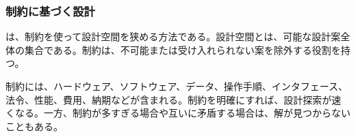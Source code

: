 \subsubsection{制約に基づく設計}

 は、制約を使って設計空間を狭める方法である。設計空間とは、可能な設計案全体の集合である。制約は、不可能または受け入れられない案を除外する役割を持つ。

制約には、ハードウェア、ソフトウェア、データ、操作手順、インタフェース、法令、性能、費用、納期などが含まれる。制約を明確にすれば、設計探索が速くなる。一方、制約が多すぎる場合や互いに矛盾する場合は、解が見つからないこともある。
